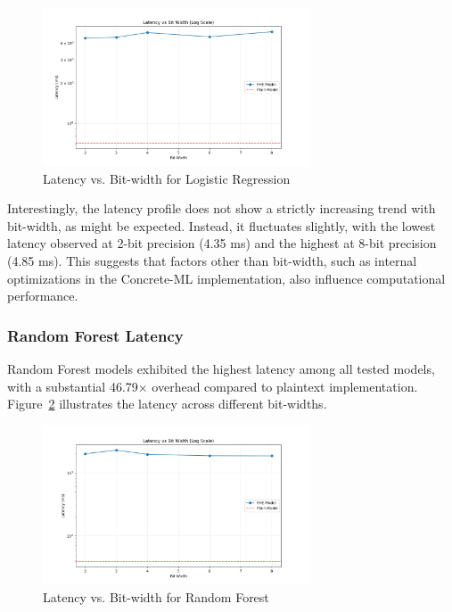 \documentclass[a4paper,12pt]{article}
\begin{document}
\begin{figure}[h]
\centering
\includegraphics[width=0.7\textwidth]{results/lr/lr_latency.png}
\caption{Latency vs. Bit-width for Logistic Regression}
\label{fig:lr_latency_vs_bitwidth}
\end{figure}

Interestingly, the latency profile does not show a strictly increasing trend with bit-width, as might be expected. Instead, it fluctuates slightly, with the lowest latency observed at 2-bit precision (4.35 ms) and the highest at 8-bit precision (4.85 ms). This suggests that factors other than bit-width, such as internal optimizations in the Concrete-ML implementation, also influence computational performance.

\subsubsection{Random Forest Latency}
Random Forest models exhibited the highest latency among all tested models, with a substantial 46.79× overhead compared to plaintext implementation. Figure~\ref{fig:rf_latency_vs_bitwidth} illustrates the latency across different bit-widths.

\begin{figure}[h]
\centering
\includegraphics[width=0.7\textwidth]{results/rf/rf_latency.png}
\caption{Latency vs. Bit-width for Random Forest}
\label{fig:rf_latency_vs_bitwidth}
\end{figure}
\end{document}
